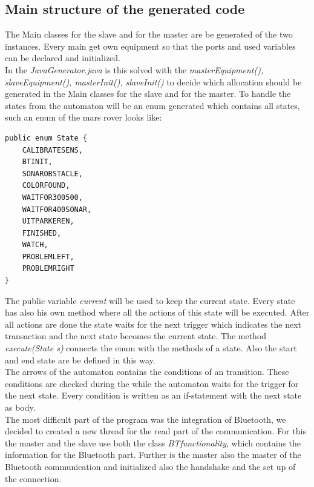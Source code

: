 \documentclass[11pt,a4paper]{article}
\begin{document}
\subsection{Main structure of the generated code}
The Main classes for the slave and for the master are be generated of the two instances. Every main get  own equipment so that the ports and used variables can be declared and initialized. \\
In the \emph{JavaGenerator.java} is this solved with the \emph{masterEquipment(), slaveEquipment(), masterInit(), slaveInit()} to decide which allocation should be generated in the Main classes for the slave and for the master. To handle the states from the automaton will be an enum generated which contains all states, such an enum of the mars rover looks like: 
\begin{verbatim}
public enum State {
    CALIBRATESENS,
    BTINIT,
    SONAROBSTACLE,
    COLORFOUND,
    WAITFOR300500,
    WAITFOR400SONAR,
    UITPARKEREN,
    FINISHED,
    WATCH,
    PROBLEMLEFT,
    PROBLEMRIGHT
}
\end{verbatim}

The public variable \emph{current} will be used to keep the current state. Every state has also his own method where all the actions of this state will be executed. After all actions are done the state waits for the next trigger which indicates the next transaction and the next state becomes the current state. 
The method \emph{execute(State s)} connects the enum with the methods of a state. Also the start and end state are be defined in this way. \\
The arrows of the automaton contains the conditions of an transition. These conditions are checked during the while the automaton waits for the trigger for the next state. Every condition is written as an if-statement with the next state as body. \\

The most difficult part of the program was the integration of Bluetooth, we decided to created a new thread for the read part of the communication. For this the master and the slave use both the class \emph{BTfunctionality}, which contains the information for the Bluetooth part. Further is the master also the master of the Bluetooth communication and initialized also the handshake and the set up of the connection. \\
\end{document}
